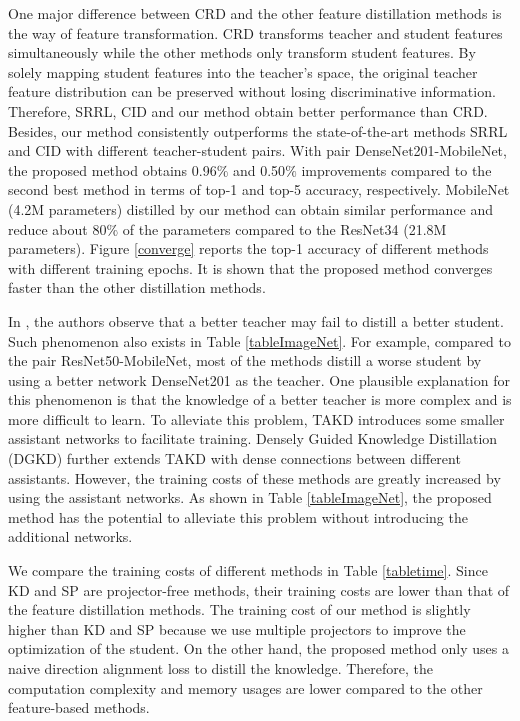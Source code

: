 \documentclass{article}
\begin{document}
One major difference between CRD and the other feature distillation methods is the way of feature transformation. CRD transforms teacher and student features simultaneously while the other methods only transform student features. By solely mapping student features into the teacher's space, the original teacher feature distribution can be preserved without losing discriminative information. Therefore, SRRL, CID and our method obtain better performance than CRD. Besides, our method consistently outperforms the state-of-the-art methods SRRL and CID with different teacher-student pairs. With pair DenseNet201-MobileNet, the proposed method obtains 0.96$\%$ and 0.50$\%$ improvements compared to the second best method in terms of top-1 and top-5 accuracy, respectively.  MobileNet (4.2M parameters) distilled by our method can obtain similar performance and reduce about 80$\%$ of the parameters compared to the ResNet34 (21.8M parameters). Figure \ref{converge} reports the top-1 accuracy of different methods with different training epochs. It is shown that the proposed method converges faster than the other distillation methods.


In \cite{takd}, the authors observe that a better teacher may fail to distill a better student. Such phenomenon also exists in Table \ref{tableImageNet}. For example, compared to the pair ResNet50-MobileNet, most of the methods distill a worse student by using a better network DenseNet201 as the teacher. One plausible explanation for this phenomenon is that the knowledge of a better teacher is more complex and is more difficult to learn. To alleviate this problem, TAKD \cite{takd} introduces some smaller assistant networks to facilitate training. Densely Guided Knowledge Distillation (DGKD) \cite{densetakd} further extends TAKD with dense connections between different assistants. However, the training costs of these methods are greatly increased by using the assistant networks. As shown in Table \ref{tableImageNet}, the proposed method has the potential to alleviate this problem without introducing the additional networks.


We compare the training costs of different methods in Table \ref{tabletime}. Since KD and SP are projector-free methods, their training costs are lower than that of the feature distillation methods. The training cost of our method is slightly higher than KD and SP because we use multiple projectors to improve the optimization of the student. On the other hand, the proposed method only uses a naive direction alignment loss to distill the knowledge. Therefore, the computation complexity and memory usages are lower compared to the other feature-based methods.
\end{document}
